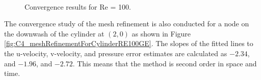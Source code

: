 \begin{figure}[H]
    \centering
    \quad
    \\
    \caption{Convergence results for Re = 100.}
    \label{fig:C4_meshConvergenceForCylidnerRE100GE}
\end{figure}

The convergence study of the mesh refinement is also conducted for a node on the downwash of the cylinder at $(2, 0)$ as shown in Figure \ref{fig:C4_meshRefinementForCylinderRE100GE}. The slopes of the fitted lines to the u-velocity, v-velocity, and pressure error estimates are calculated as $-2.34$, and $-1.96$, and $-2.72$. This means that the method is second order in space and time.

